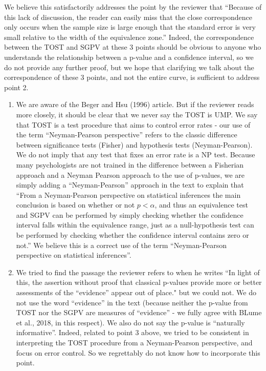 \documentclass[man]{apa6}
\begin{document}
We believe this satisfactorily addresses the point by the reviewer that \enquote{Because of this
lack of discussion, the reader can easily miss that the close correspondence only occurs when
the sample size is large enough that the standard error is very small relative to the width of the
equivalence zone.} Indeed, the correspondence between the TOST and SGPV at these 3 points should be obvious to anyone who understands the relationship between a p-value and a confidence interval, so we do not provide any further proof, but we hope that clarifying we talk about the correspondence of these 3 points, and not the entire curve, is sufficient to address point 2.

\begin{enumerate}
\def\labelenumi{\arabic{enumi}.}
\setcounter{enumi}{2}
\item
  We are aware of the Beger and Hsu (1996) article. But if the reviewer reads more closely, it should be clear that we never say the TOST is UMP. We say that TOST is a test procedure that aims to control error rates - our use of the term \enquote{Neyman-Pearson perspective} refers to the classic difference between significance tests (Fisher) and hypothesis tests (Neyman-Pearson). We do not imply that any test that fixes an error rate is a NP test. Because many psychologists are not trained in the difference between a Fisherian approach and a Neyman Pearson approach to the use of p-values, we are simply adding a \enquote{Neyman-Pearson} approach in the text to explain that \enquote{From a Neyman-Pearson perspective on statistical inferences the main conclusion is based on whether or not \(p < \alpha\), and thus an equivalence test and SGPV can be performed by simply checking whether the confidence interval falls within the equivalence range, just as a null-hypothesis test can be performed by checking whether the confidence interval contains zero or not.} We believe this is a correct use of the term \enquote{Neyman-Pearson perspective on statistical inferences}.
\item
  We tried to find the passage the reviewer refers to when he writes \enquote{In light of this, the assertion without proof that classical p-values provide more or better assessments of the ``evidence} appear out of place." but we could not. We do not use the word \enquote{evidence} in the text (because neither the p-value from TOST nor the SGPV are measures of \enquote{evidence} - we fully agree with BLume et al., 2018, in this respect). We also do not say the p-value is \enquote{naturally informative}. Indeed, related to point 3 above, we tried to be consistent in interpreting the TOST procedure from a Neyman-Pearson perspective, and focus on error control. So we regrettably do not know how to incorporate this point.

\end{enumerate}
\end{document}
